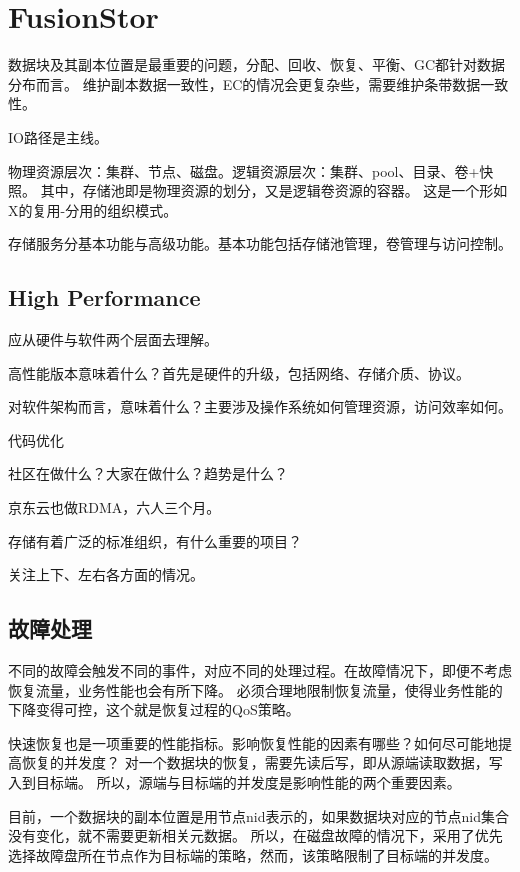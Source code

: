 \chapter{FusionStor}

数据块及其副本位置是最重要的问题，分配、回收、恢复、平衡、GC都针对数据分布而言。
维护副本数据一致性，EC的情况会更复杂些，需要维护条带数据一致性。

IO路径是主线。

物理资源层次：集群、节点、磁盘。逻辑资源层次：集群、pool、目录、卷+快照。
其中，存储池即是物理资源的划分，又是逻辑卷资源的容器。
这是一个形如X的复用-分用的组织模式。

存储服务分基本功能与高级功能。基本功能包括存储池管理，卷管理与访问控制。

\section{High Performance}

应从硬件与软件两个层面去理解。

高性能版本意味着什么？首先是硬件的升级，包括网络、存储介质、协议。

对软件架构而言，意味着什么？主要涉及操作系统如何管理资源，访问效率如何。

代码优化

社区在做什么？大家在做什么？趋势是什么？

京东云也做RDMA，六人三个月。

存储有着广泛的标准组织，有什么重要的项目？

关注上下、左右各方面的情况。

\section{故障处理}

不同的故障会触发不同的事件，对应不同的处理过程。在故障情况下，即便不考虑恢复流量，业务性能也会有所下降。
必须合理地限制恢复流量，使得业务性能的下降变得可控，这个就是恢复过程的QoS策略。

快速恢复也是一项重要的性能指标。影响恢复性能的因素有哪些？如何尽可能地提高恢复的并发度？
对一个数据块的恢复，需要先读后写，即从源端读取数据，写入到目标端。
所以，源端与目标端的并发度是影响性能的两个重要因素。

目前，一个数据块的副本位置是用节点nid表示的，如果数据块对应的节点nid集合没有变化，就不需要更新相关元数据。
所以，在磁盘故障的情况下，采用了优先选择故障盘所在节点作为目标端的策略，然而，该策略限制了目标端的并发度。

